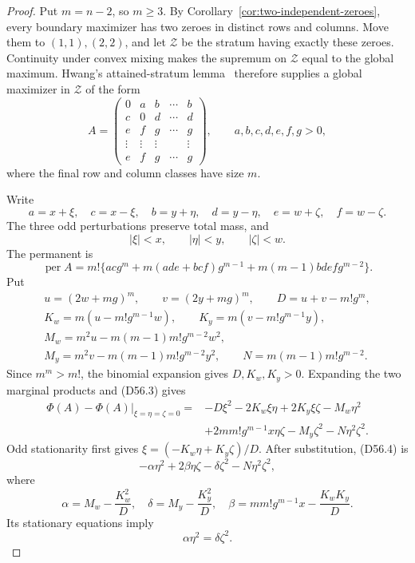 \documentclass[10pt,a4paper]{amsart}
\theoremstyle{definition}
\theoremstyle{remark}
\begin{document}
\begin{proof}
Put \(m=n-2\), so \(m\geq3\).  By
Corollary~\ref{cor:two-independent-zeroes}, every boundary maximizer has two
zeroes in distinct rows and columns.  Move them to \((1,1),(2,2)\), and let
\(\mathcal Z\) be the stratum having exactly these zeroes. Continuity under
convex mixing makes the supremum on \(\mathcal Z\) equal to the global
maximum. Hwang's attained-stratum lemma~\cite[Lemma 3.4]{CW} therefore
supplies a global maximizer in \(\mathcal Z\) of the form
\[
A=\begin{pmatrix}
0&a&b&\cdots&b\\
c&0&d&\cdots&d\\
e&f&g&\cdots&g\\
\vdots&\vdots&\vdots&&\vdots\\
e&f&g&\cdots&g
\end{pmatrix},\qquad a,b,c,d,e,f,g>0,              \tag{D56.1}
\]
where the final row and column classes have size \(m\).

Write
\[
a=x+\xi,\quad c=x-\xi,\quad b=y+\eta,\quad d=y-\eta,
\quad e=w+\zeta,\quad f=w-\zeta.
\]
The three odd perturbations preserve total mass, and
\[
|\xi|<x,\qquad|\eta|<y,\qquad|\zeta|<w.             \tag{D56.2}
\]
The permanent is
\[
\operatorname{per}A=m!\{acg^m+m(ade+bcf)g^{m-1}
+m(m-1)bdefg^{m-2}\}.                              \tag{D56.3}
\]
Put
\[
\begin{gathered}
u=(2w+mg)^m,\qquad v=(2y+mg)^m,\qquad D=u+v-m!g^m,\\
K_w=m(u-m!g^{m-1}w),\qquad K_y=m(v-m!g^{m-1}y),\\
M_w=m^2u-m(m-1)m!g^{m-2}w^2,\\
M_y=m^2v-m(m-1)m!g^{m-2}y^2,\qquad
N=m(m-1)m!g^{m-2}.
\end{gathered}
\]
Since \(m^m>m!\), the binomial expansion gives \(D,K_w,K_y>0\).
Expanding the two marginal products and (D56.3) gives
\[
\begin{split}
\Phi(A)-\Phi(A)|_{\xi=\eta=\zeta=0}
={}&-D\xi^2-2K_w\xi\eta+2K_y\xi\zeta-M_w\eta^2\\
&+2mm!g^{m-1}x\eta\zeta-M_y\zeta^2-N\eta^2\zeta^2.
\end{split}
\tag{D56.4}
\]
Odd stationarity first gives
\(\xi=(-K_w\eta+K_y\zeta)/D\). After substitution, (D56.4) is
\[
-\alpha\eta^2+2\beta\eta\zeta-\delta\zeta^2
-N\eta^2\zeta^2,                                  \tag{D56.5}
\]
where
\[
\alpha=M_w-\frac{K_w^2}{D},\quad
\delta=M_y-\frac{K_y^2}{D},\quad
\beta=mm!g^{m-1}x-\frac{K_wK_y}{D}.                \tag{D56.6}
\]
Its stationary equations imply
\[
\alpha\eta^2=\delta\zeta^2.                        \tag{D56.7}
\]


\end{proof}
\end{document}

